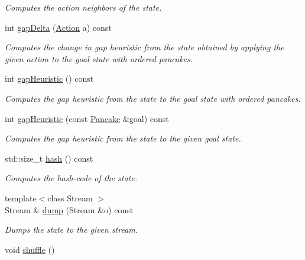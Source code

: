 \begin{DoxyCompactItemize}
\begin{DoxyCompactList}\small\item\em Computes the action neighbors of the state. \end{DoxyCompactList}\item 
int \hyperlink{structpancake_1_1Pancake_af050e23dfddfdf4ea97fe20a531f8b3f}{gap\+Delta} (\hyperlink{structpancake_1_1Pancake_aad1b4a78f22485b896ac7e89aed5f099}{Action} a) const 
\begin{DoxyCompactList}\small\item\em Computes the change in gap heuristic from the state obtained by applying the given action to the goal state with ordered pancakes. \end{DoxyCompactList}\item 
int \hyperlink{structpancake_1_1Pancake_a3c081806e5a3c651cb2db2551d2d194b}{gap\+Heuristic} () const 
\begin{DoxyCompactList}\small\item\em Computes the gap heuristic from the state to the goal state with ordered pancakes. \end{DoxyCompactList}\item 
int \hyperlink{structpancake_1_1Pancake_aebc85423b1d0b3b01717c7563eb19013}{gap\+Heuristic} (const \hyperlink{structpancake_1_1Pancake}{Pancake} \&goal) const 
\begin{DoxyCompactList}\small\item\em Computes the gap heuristic from the state to the given goal state. \end{DoxyCompactList}\item 
std\+::size\+\_\+t \hyperlink{structpancake_1_1Pancake_ae00aea4538a1b44f3ccf2ebb05f1dc97}{hash} () const 
\begin{DoxyCompactList}\small\item\em Computes the hash-\/code of the state. \end{DoxyCompactList}\item 
{\footnotesize template$<$class Stream $>$ }\\Stream \& \hyperlink{structpancake_1_1Pancake_af24ddf1cf65dcf4f25702f6d825d065a}{dump} (Stream \&o) const 
\begin{DoxyCompactList}\small\item\em Dumps the state to the given stream. \end{DoxyCompactList}\item 
void \hyperlink{structpancake_1_1Pancake_a79eb473f7dca58f3245f4a5f0bcfe80a}{shuffle} ()\hypertarget{structpancake_1_1Pancake_a79eb473f7dca58f3245f4a5f0bcfe80a}{}\label{structpancake_1_1Pancake_a79eb473f7dca58f3245f4a5f0bcfe80a}


\end{DoxyCompactItemize}
